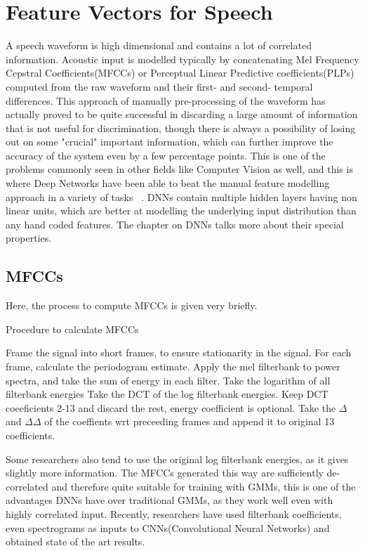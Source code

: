 \documentclass[a4paper,11pt]{kth-mag}
\begin{document}
\section{Feature Vectors for Speech}
A speech waveform is high dimensional and contains a lot of correlated information. Acoustic input is
modelled typically by concatenating Mel Frequency Cepstral Coefficients(MFCCs) or Perceptual Linear Predictive coefficients(PLPs)
computed from the raw waveform and their first- and second- temporal differences. This approach of manually
pre-processing of the waveform has actually proved to be quite successful 
in discarding a large amount of information that is not useful for discrimination,
though there is always a possibility of losing out on some "crucial" important information, which can further improve the accuracy of the system even by a few percentage points. This is one of the problems commonly seen in other fields like Computer Vision as well,
and this is where Deep Networks have been able to beat the manual feature modelling approach in a variety of tasks ~\cite{Alexnet-2012}. 
DNNs contain multiple hidden layers having non linear units, which are better at modelling the underlying input distribution than any hand coded features. The chapter on DNNs talks more about their special properties.
\subsection{MFCCs}
Here, the process to compute MFCCs is given very briefly. 
\begin{algorithm}
\caption{Procedure to calculate MFCCs}
\begin{algorithmic}[1]
 \scriptsize
  \STATE Frame the signal into short frames, to ensure stationarity in the signal.
  \STATE For each frame, calculate the periodogram estimate.
  \STATE Apply the mel filterbank to power spectra, and take the sum of energy in each filter.
  \STATE Take the logarithm of all filterbank energies
  \STATE Take the DCT of the log filterbank energies.
  \STATE Keep DCT coeeficients 2-13 and discard the rest, energy coefficient is optional.
  \STATE Take the $\Delta$ and $\Delta\Delta$ of the coeffients wrt preceeding frames and append it to original 13 coefficients.
\end{algorithmic}
\end{algorithm}

Some researchers also tend to use the original log filterbank energies, as it gives slightly more information. The MFCCs generated this way are sufficiently de-correlated and therefore quite suitable for training with GMMs, this is one of the advantages DNNs have over traditional GMMs, as they work well even with highly correlated input. Recently, researchers have used filterbank coefficients, even spectrograms as inputs to CNNs(Convolutional Neural Networks) and obtained state of the art results. 
\end{document}
